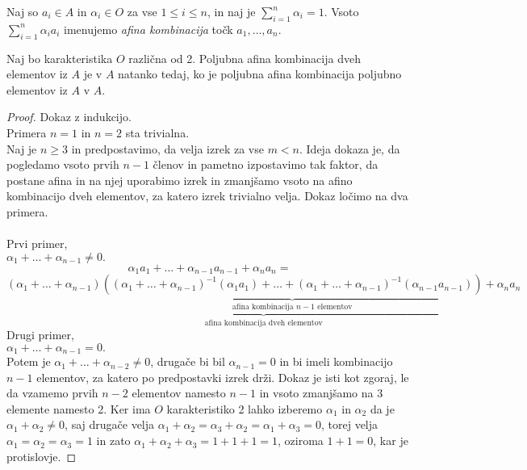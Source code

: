 \begin{definicija}
    Naj so $a_{i} \in A$ in $\alpha_{i} \in O$ za vse $1 \leq i \leq n$, in naj je $\sum_{i=1}^{n} \alpha_{i} = 1$. Vsoto $\sum_{i=1}^{n} \alpha_{i} a_{i}$ imenujemo \emph{afina kombinacija} točk $a_1,\dots, a_n$.
\end{definicija}

\begin{lema}
    Naj bo karakteristika $O$ različna od 2. Poljubna afina kombinacija dveh elementov iz $A$ je v $A$ natanko tedaj, ko je poljubna afina kombinacija poljubno elementov iz $A$ v $A$.
\end{lema}

\begin{proof}
    Dokaz z indukcijo.\\
    Primera $n = 1$ in $n = 2$ sta trivialna.\\
    Naj je $n \geq 3$ in predpostavimo, da velja izrek za vse $m < n$. Ideja dokaza je, da pogledamo vsoto prvih $n - 1$ členov in pametno izpostavimo tak faktor, da postane afina in na njej uporabimo izrek
    in zmanjšamo vsoto na afino kombinacijo dveh elementov, za katero izrek trivialno velja.
    Dokaz ločimo na dva primera.\\ \\
    Prvi primer,\\
    $\alpha_1 + \dots + \alpha_{n-1} \neq 0.$\\
    $$
        \alpha_1 a_1 + \dots + \alpha_{n-1} a_{n-1} + \alpha_n a_n = $$ $$
        \underbrace{(\alpha_1 + \dots + \alpha_{n-1})\underbrace{((\alpha_1 + \dots + \alpha_{n-1})^{-1}(\alpha_1 a_1) + \dots + (\alpha_1 + \dots + \alpha_{n-1})^{-1}(\alpha_{n-1} a_{n-1}))}_{\textrm{afina kombinacija } n-1 \textrm{ elementov} } + \alpha_n a_n}_{\textrm{afina kombinacija dveh elementov}}
    $$
    Drugi primer, \\
    $\alpha_1 + \dots + \alpha_{n-1} = 0.$\\
    Potem je $\alpha_1 + \dots + \alpha_{n-2} \neq 0$, drugače bi bil $\alpha_{n-1} = 0$ in bi imeli kombinacijo $n-1$ elementov, za katero po predpostavki izrek drži.
    Dokaz je isti kot zgoraj, le da vzamemo prvih $n-2$ elementov namesto $n-1$ in vsoto zmanjšamo na 3 elemente namesto 2. Ker ima $O$ karakteristiko 2 lahko izberemo $\alpha_1$ in $\alpha_2$ da je $\alpha_1 + \alpha_2 \neq 0$,
    saj drugače velja $\alpha_1 + \alpha_2 = \alpha_3 + \alpha_2 = \alpha_1 + \alpha_3 = 0$, torej velja $\alpha_1 = \alpha_2 = \alpha_3 = 1$ in zato $\alpha_1 + \alpha_2 + \alpha_3 = 1 + 1 + 1 = 1$, oziroma $1 + 1 = 0$, kar je protislovje.
\end{proof}


